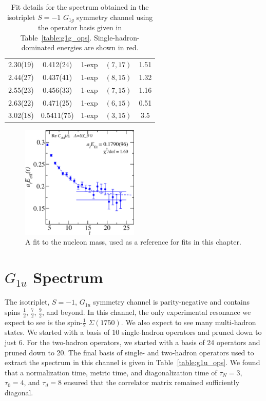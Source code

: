 \begin{table}
\begin{tabu}{c|c|c|c|c}
        2.30(19)&0.412(24)&1{-}exp&$(7, 17)$&1.51 \\
        2.44(27)&0.437(41)&1{-}exp&$(8, 15)$&1.32 \\
        \rowfont{\color{red}}
        2.55(23)&0.456(33)&1{-}exp&$(7, 15)$&1.16 \\
        2.63(22)&0.471(25)&1{-}exp&$(6, 15)$&0.51 \\
        3.02(18)&0.5411(75)&1{-}exp&$(3, 15)$&3.5 \\
    \end{tabu}
    \caption{Fit details for the spectrum obtained in the isotriplet $S=-1$ $G_{1g}$ symmetry channel using the operator basis given in Table~\ref{table:g1g_ops}. Single-hadron-dominated energies are shown in red.}\label{table:g1g_fits}
\end{table}
\renewcommand{\arraystretch}{1.5}

\begin{figure}[H]
    \centering
    \hspace*{-1.5cm}\includegraphics[width=0.5\textwidth]{figures/nucleon.pdf}
    \caption{A fit to the nucleon mass, used as a reference for fits in this chapter.}\label{fig:nucleon_fit}
\end{figure}

\section{$G_{1u}$ Spectrum}
The isotriplet, $S=-1$, $G_{1u}$ symmetry channel is parity-negative and contains spins $\frac{1}{2}$, $\frac{7}{2}$, $\frac{9}{2}$, and beyond. In this channel, the only experimental resonance we expect to see is the spin-$\frac{1}{2}$ $\Sigma(1750)$. We also expect to see many multi-hadron states. We started with a basis of 10 single-hadron operators and pruned down to just 6. For the two-hadron operators, we started with a basis of 24 operators and pruned down to 20. The final basis of single- and two-hadron operators used to extract the spectrum in this channel is given in Table~\ref{table:g1u_ops}. We found that a normalization time, metric time, and diagonalization time of $\tau_N=3$, $\tau_0=4$, and $\tau_d=8$ ensured that the correlator matrix remained sufficiently diagonal.

